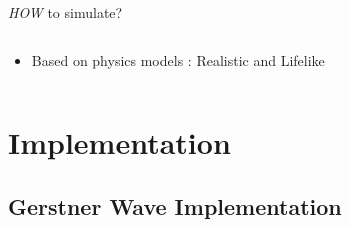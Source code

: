 \documentclass[handout,t]{beamer}
\begin{document}
\begin{frame}[t]{\emph{HOW} to simulate?}
\begin{columns}
\begin{column}
\begin{itemize}
        \item Based on physics models : Realistic and Lifelike
        \begin{figure}[thpb]
          \centering
        \label{fig:system}
        \end{figure}
      \end{itemize}
    \end{column}%
  \end{columns}
\end{frame}


\section{Implementation}

\subsection{Gerstner Wave Implementation}
\end{document}
